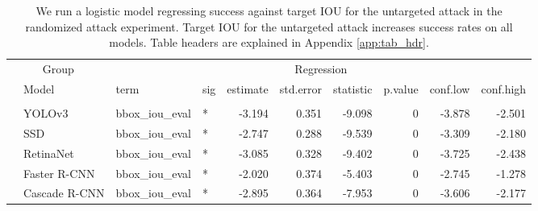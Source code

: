 \begingroup\fontsize{9}{11}\selectfont

\begin{longtable}[t]{llllrrrrrr}
\caption{\label{tab:untarget_iou_table}We run a logistic model regressing success against target IOU for the untargeted attack in the randomized attack experiment. Target IOU for the untargeted attack increases success rates on all models. Table headers are explained in Appendix \ref{app:tab_hdr}.}\\
\toprule
\multicolumn{2}{c}{Group} & \multicolumn{8}{c}{Regression} \\
\cmidrule(l{3pt}r{3pt}){1-2} \cmidrule(l{3pt}r{3pt}){3-10}
 & Model & term & sig & estimate & std.error & statistic & p.value & conf.low & conf.high\\
\midrule
\addlinespace[0.3em]
\multicolumn{10}{l}{\textbf{Untargeted}}\\
\hspace{1em} & YOLOv3 & bbox\_iou\_eval & * & -3.194 & 0.351 & -9.098 & 0 & -3.878 & -2.501\\
\cmidrule{2-10}\nopagebreak
\hspace{1em} & SSD & bbox\_iou\_eval & * & -2.747 & 0.288 & -9.539 & 0 & -3.309 & -2.180\\
\cmidrule{2-10}\nopagebreak
\hspace{1em} & RetinaNet & bbox\_iou\_eval & * & -3.085 & 0.328 & -9.402 & 0 & -3.725 & -2.438\\
\cmidrule{2-10}\nopagebreak
\hspace{1em} & Faster R-CNN & bbox\_iou\_eval & * & -2.020 & 0.374 & -5.403 & 0 & -2.745 & -1.278\\
\cmidrule{2-10}\nopagebreak
\hspace{1em} & Cascade R-CNN & bbox\_iou\_eval & * & -2.895 & 0.364 & -7.953 & 0 & -3.606 & -2.177\\
\bottomrule
\end{longtable}
\endgroup{}
